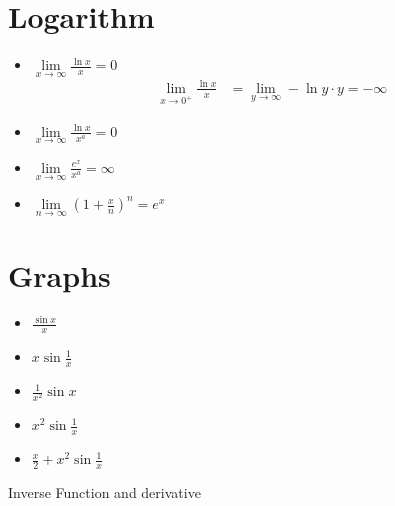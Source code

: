 \documentclass[12pt]{article}
\theoremstyle{plain}
\newcommand{\dlim}{\displaystyle\lim\limits}
\begin{document}
	\section{Logarithm}
	\begin{itemize}
		\item $\dlim_{x\to \infty} \frac{\ln x}x=0$
			\begin{align*}
				\lim_{x\to 0^+}\frac{\ln x}x &=\lim_{y\to \infty}-\ln y\cdot y=-\infty
			\end{align*}
		\item $\dlim_{x\to \infty} \frac{\ln x}{x^a} = 0$
		\item $\dlim_{x\to \infty} \frac{e^x}{x^a} = \infty$
		\item $\dlim_{n\to \infty} (1+\frac xn)^n = e^x$
	\end{itemize}

	\section{Graphs}
	\begin{itemize}
		\item $\frac{\sin x}x$
		\item $x\sin \frac1x$
		\item $\frac{1}{x^2}\sin x$
		\item $x^2\sin \frac1x$
		\item $\frac x2+x^2\sin\frac1x$
	\end{itemize}

	Inverse Function and derivative
	
\end{document}
